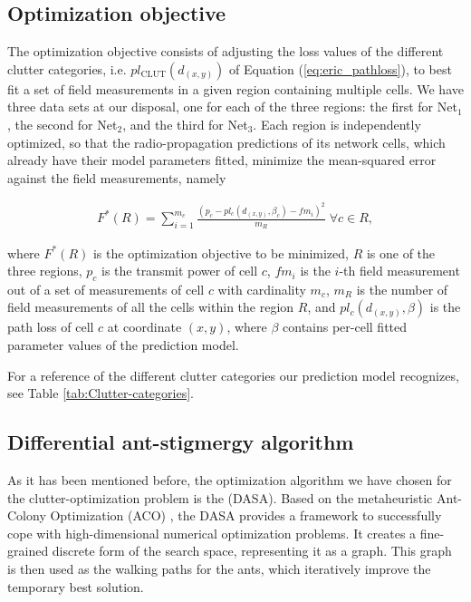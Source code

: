 \subsection{Optimization objective \label{sub:Optimization-objective}}

The optimization objective consists of adjusting the loss values of
the different clutter categories, i.e. $pl_{\mathrm{CLUT}}(d_{(x,y)})$
of Equation (\ref{eq:eric_pathloss}), to best fit a set of field
measurements in a given region containing multiple cells. We have
three data sets at our disposal, one for each of the three regions:
the first for Net$_{1}$, the second for Net$_{2}$, and the third
for Net$_{3}$. Each region is independently optimized, so that the
radio-propagation predictions of its network cells, which already
have their model parameters fitted, minimize the mean-squared error
against the field measurements, namely

\begin{multline}
F^{*}(R)=\sum_{i=1}^{m_{c}}\frac{(p_{c}-pl_{c}(d_{(x,y)},\beta_{c})-fm_{i})^{2}}{m_{R}}\;\forall c\in R,\label{eq:mean_squared_error}
\end{multline}


\noindent where $F^{*}(R)$ is the optimization objective to be minimized,
$R$ is one of the three regions, $p_{c}$ is the transmit power of
cell $c$, $fm_{i}$ is the $i$-th field measurement out of a set
of measurements of cell $c$ with cardinality $m_{c}$, $m_{R}$ is
the number of field measurements of all the cells within the region
$R$, and $pl_{c}(d_{(x,y)},\beta)$ is the path loss of cell $c$
at coordinate $(x,y)$, where $\beta$ contains per-cell fitted parameter
values of the prediction model.

For a reference of the different clutter categories our prediction
model recognizes, see Table \ref{tab:Clutter-categories}.


\subsection{Differential ant-stigmergy algorithm}

As it has been mentioned before, the optimization algorithm we have
chosen for the clutter-optimization problem is the (DASA). Based on
the metaheuristic Ant-Colony Optimization (ACO) \cite{Dorigo_Ant_colony_optimization:2006},
the DASA \cite{Korosec-The_differential_ant_stigmergy_algorithm:2012}
provides a framework to successfully cope with high-dimensional numerical
optimization problems. It creates a fine-grained discrete form of
the search space, representing it as a graph. This graph is then used
as the walking paths for the ants, which iteratively improve the temporary
best solution.

